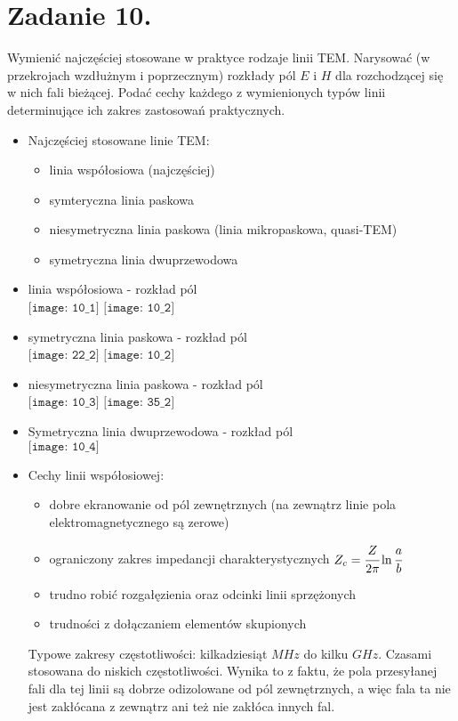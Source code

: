 
\section*{Zadanie 10.}
\begin{task}
Wymienić najczęściej stosowane w praktyce rodzaje linii TEM. Narysować (w przekrojach wzdłużnym i poprzecznym) rozkłady pól $E$ i $H$ dla rozchodzącej się w nich fali bieżącej. Podać cechy każdego z wymienionych typów linii determinujące ich zakres zastosowań praktycznych.\\
\end{task}

\begin{solution}
\begin{itemize}
\item Najczęściej stosowane linie TEM:
	\begin{itemize}
	\item linia współosiowa (najczęściej)
	\item symteryczna linia paskowa
	\item niesymetryczna linia paskowa (linia mikropaskowa, quasi-TEM)
	\item symetryczna linia dwuprzewodowa
	\end{itemize}
\item linia współosiowa - rozkład pól\\
$\texttt{[image: 10\_1]}$    $\texttt{[image: 10\_2]}$
\item symetryczna linia paskowa - rozkład pól\\
$\texttt{[image: 22\_2]}$    $\texttt{[image: 10\_2]}$
\item niesymetryczna linia paskowa - rozkład pól\\
$\texttt{[image: 10\_3]}$    $\texttt{[image: 35\_2]}$
\item Symetryczna linia dwuprzewodowa - rozkład pól\\
$\texttt{[image: 10\_4]}$
\item Cechy linii współosiowej:
	\begin{itemize}
	\item dobre ekranowanie od pól zewnętrznych (na zewnątrz linie pola elektromagnetycznego są zerowe)
	\item ograniczony zakres impedancji charakterystycznych $Z_{c}=\cfrac{Z}{2\pi}\ln{\cfrac{a}{b}}$
	\item trudno robić rozgałęzienia oraz odcinki linii sprzężonych
	\item trudności z dołączaniem elementów skupionych
\end{itemize}
Typowe zakresy częstotliwości: kilkadziesiąt $MHz$ do kilku $GHz$. Czasami stosowana do niskich częstotliwości. Wynika to z faktu, że pola przesyłanej fali dla tej linii są dobrze odizolowane od pól zewnętrznych, a więc fala ta nie jest zakłócana z zewnątrz ani też nie zakłóca innych fal.


\end{itemize}
\end{solution}
